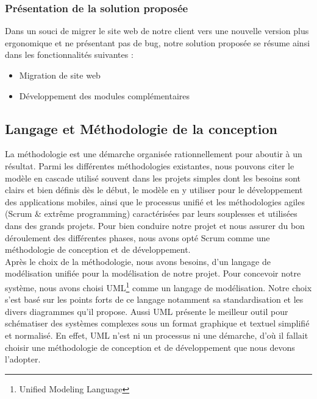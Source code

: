 \documentclass{article}
\begin{document}
\subsubsection{Présentation de la solution proposée}
Dans un souci de migrer le site web de notre client vers une nouvelle version plus ergonomique et ne présentant pas de bug,  notre solution proposée se résume ainsi dans les fonctionnalités suivantes :
\begin{itemize}
\item Migration de site web
\item Développement des modules complémentaires
\end{itemize}
\cleardoublepage
\subsection{Langage et Méthodologie de la conception}
La méthodologie est une démarche organisée rationnellement pour aboutir à un résultat.
Parmi les différentes méthodologies existantes, nous pouvons citer le modèle en cascade utilisé souvent dans les projets simples dont les besoins sont clairs et bien définis dès le début, le modèle en y utiliser pour le développement des applications mobiles, ainsi que le processus unifié et les méthodologies agiles (Scrum \& extrême programming) caractérisées par leurs souplesses et utilisées dans des grands projets.
Pour bien conduire notre projet et nous assurer du bon déroulement des différentes phases, nous avons opté Scrum comme une méthodologie de conception et de développement.\\
Après le choix de la méthodologie, nous avons besoins, d’un langage de modélisation unifiée pour la modélisation de notre projet. Pour concevoir notre système, nous avons choisi UML\footnote{Unified Modeling Language}  comme un langage de modélisation.
Notre choix s'est basé sur les points forts de ce langage notamment sa standardisation et les divers diagrammes qu’il propose. Aussi UML présente le meilleur outil pour schématiser des systèmes complexes sous un format graphique et textuel simplifié et normalisé.
En effet, UML n'est ni un processus ni une démarche, d'où il fallait choisir une méthodologie de conception et de développement que nous devons l'adopter.
\end{document}
